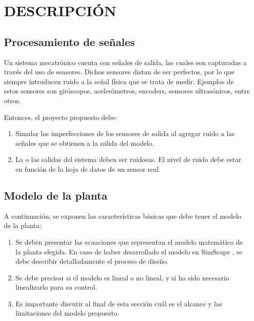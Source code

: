 \documentclass{article}
\begin{document}
\section{DESCRIPCIÓN}
\label{sec:descripciión}


\subsection{Procesamiento de señales}
\label{sec:dsp}

Un sistema mecatrónico cuenta con señales de salida, las cuales son capturadas a través del uso de sensores. Dichos sensores distan de ser perfectos, por lo que siempre introducen ruido a la señal física que se trata de medir. Ejemplos de estos sensores son giróscopos, acelerómetros, encoders, sensores ultrasónicos, entre otros.

Entonces, el proyecto propuesto debe:

\begin{enumerate}

    \item Simular las imperfecciones de los sensores de salida al agregar ruido a las señales que se obtienen a la salida del modelo.

    \item La o las salidas del sistema deben ser ruidosas. El nivel de ruido debe estar en función de la hoja de datos de un sensor real.
\end{enumerate}

\subsection{Modelo de la planta}
\label{sec:modelo}

A continuación, se exponen las características básicas que debe tener el modelo de la planta:

\begin{enumerate}

    \item Se deben presentar las ecuaciones que representan el modelo matemático de la planta elegida. En caso de haber desarrollado el modelo en SimScape \cite{Simscape2019}, se debe describir detalladamente el proceso de diseño.

    \item Se debe precisar si el modelo es lineal o no lineal, y si ha sido necesario linealizarlo para su control.

    \item Es importante discutir al final de esta sección cuál es el alcance y las limitaciones del modelo propuesto.

\end{enumerate}
\end{document}
